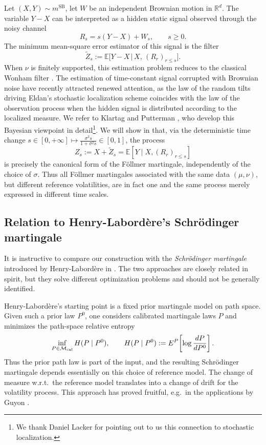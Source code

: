\documentclass[reqno, a4paper]{amsart}
\newcommand{\msb}{m^{\text{SB}}}
\theoremstyle{plain}
\theoremstyle{definition}
\theoremstyle{remark}
\numberwithin{equation}{section}
\numberwithin{theorem}{section}
\newcommand{\R}{\mathbb{R}}
\newcommand{\E}{\mathbb{E}}
\begin{document}
	
	{Let \((X,Y)\sim \msb\), let \(W\) be an independent Brownian motion in \(\R^d\). The variable $Y - X$ can be interpreted as a hidden static signal observed through the noisy channel
		\[
		R_s = s(Y - X) + W_s, \qquad s \geq 0.
		\]
		The minimum mean-square error estimator of this signal is the filter
		\[
		\tilde{Z}_s := \E\bigl[Y - X \,\big|\, X ,\, (R_r)_{r \leq s}\bigr].
		\]
		When $\nu$ is finitely supported, this estimation problem reduces to the classical Wonham filter \cite{Wo64}. The estimation of time-constant signal corrupted with Brownian noise have recently attracted renewed attention, as the law of the random tilts driving Eldan's stochastic localization scheme coincides with the law of the observation process when the hidden signal is distributed according to the localized measure. We refer to Klartag and Putterman \cite[Section 4]{KlPu2023}, who develop this Bayesian viewpoint in detail\footnote{We thank Daniel Lacker for pointing out to us this connection to stochastic localization.}. 	
		We will show in  that, via the deterministic time change $s \in [0, +\infty ] \mapsto \frac{\sigma^2 s}{1+\sigma^2 s} \in [0,1]$, the process $$Z_s := X + \tilde{Z}_s = \E[Y \mid X, (R_r)_{r \leq s}]$$ is precisely the canonical form of the F\"ollmer martingale, independently of the choice of \(\sigma\). Thus all F\"ollmer martingales associated with the same data \((\mu, \nu)\), but different reference volatilities, are in fact one and the same process merely expressed in different time scales.}
	
	
	\subsection{Relation to Henry-Labord\`ere's Schr\"odinger martingale}
	
	
	It is instructive to compare our construction with the \emph{Schr\"odinger martingale} introduced by Henry-Labord\`ere in \cite{He19}.
	The two approaches are closely related in spirit, but they solve different optimization problems and should not be generally identified.
	
	Henry-Labord\`ere's starting point is a fixed prior martingale model on path space.
	Given such a prior law \(P^0\), one considers calibrated martingale laws \(P\) and minimizes the path-space relative entropy
	\[
	\inf_{P\in\mathcal M_{\rm cal}} H(P\mid P^0),
	\qquad
	H(P\mid P^0):=E^P\!\left[\log\frac{dP}{dP^0}\right].
	\]
	Thus the prior path law is part of the input, and the resulting Schr\"odinger martingale depends essentially on this choice of reference model. The change of measure w.r.t.\ the reference model translates into a change of drift for the volatility process. This approach has proved fruitful, e.g.\ in the applications by Guyon \cite{GuMeNu17}.
	
\end{document}
